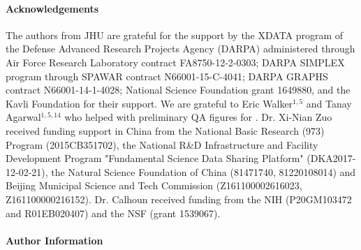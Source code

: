 \documentclass[11pt]{article}
\begin{document}
\paragraph{Acknowledgements} 
{\small
The authors from JHU are grateful for the support  by the XDATA program of the Defense Advanced Research Projects Agency (DARPA) administered through Air
Force Research Laboratory contract FA8750-12-2-0303;  DARPA SIMPLEX
program through SPAWAR contract N66001-15-C-4041;  DARPA GRAPHS
contract N66001-14-1-4028; National Science Foundation grant 1649880, 
 and
the Kavli Foundation for their support. We are grateful to Eric Walker$^{1, 5}$ and Tanay Agarwal$^{1, 5, 14}$ who helped with preliminary QA figures for \ndmgf.
Dr. Xi-Nian Zuo received funding support in China from the National Basic Research (973) Program (2015CB351702), the National R{\&}D Infrastructure and Facility Development Program "Fundamental Science Data Sharing Platform" (DKA2017-12-02-21), the Natural Science Foundation of China (81471740, 81220108014) and Beijing Municipal Science and Tech Commission (Z161100002616023, Z161100000216152).
Dr. Calhoun received funding from the NIH (P20GM103472 and R01EB020407) and the NSF (grant 1539067). %
}

\paragraph{Author Information}
\end{document}
